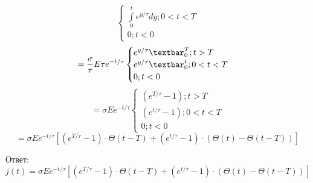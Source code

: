\documentclass[12pt]{article}
\begin{document}
\begin{large}
\[\begin{cases}
        \int\limits_{0}^{t} e^{y/\tau} dy ; 0 < t < T
        \\
        0 ; t < 0
    \end{cases}
\]
\[
    = \frac{\sigma}{\tau} E \tau e^{-t/\tau}
    \begin{cases}
        e^{y/\tau}  \textbar_{0}^{T} ; t > T
        \\
        e^{y/\tau}  \textbar_{0}^{t} ; 0 < t < T
        \\
        0 ; t < 0
    \end{cases}
\]
\[
    = \sigma E e^{-t/\tau}
    \begin{cases}
        (e^{T/\tau} - 1) ; t > T
        \\
        (e^{t/\tau} - 1)  ; 0 < t < T
        \\
        0 ; t < 0
    \end{cases}
\]
\[
    = \sigma E e^{-t/\tau} [(e^{T/\tau} - 1) \cdot \Theta(t - T) + (e^{t/\tau} - 1) \cdot (\Theta(t) - \Theta(t - T) )]
\]
\par Ответ:
\[
   j(t) = \sigma E e^{-t/\tau} [(e^{T/\tau} - 1) \cdot \Theta(t - T) + (e^{t/\tau} - 1) \cdot (\Theta(t) - \Theta(t - T) )]
\]
\end{large}
\end{document}
